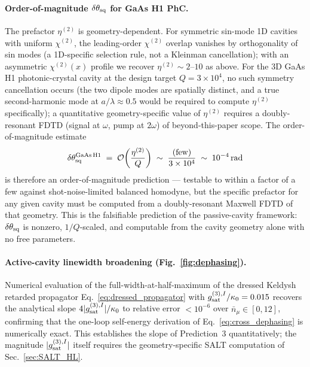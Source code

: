 \documentclass[12pt]{article}
\begin{document}
\paragraph{Order-of-magnitude $\delta\theta_{\rm sq}$ for GaAs H1 PhC.}
The prefactor $\eta^{(2)}$ is geometry-dependent.  For symmetric
sin-mode 1D cavities with uniform $\chi^{(2)}$, the leading-order
$\chi^{(2)}$ overlap vanishes by orthogonality of sin modes
(a 1D-specific selection rule, not a Kleinman cancellation); with an
asymmetric $\chi^{(2)}(x)$ profile we recover $\eta^{(2)}\sim 2$--$10$
as above.  For the 3D GaAs H1 photonic-crystal cavity at the design
target $Q=3\times 10^4$, no such symmetry cancellation occurs (the
two dipole modes are spatially distinct, and a true second-harmonic
mode at $a/\lambda\approx 0.5$ would be required to compute $\eta^{(2)}$
specifically); a quantitative geometry-specific value of $\eta^{(2)}$
requires a doubly-resonant FDTD (signal at $\omega$, pump at $2\omega$)
of beyond-this-paper scope.  The order-of-magnitude estimate
\begin{equation}
  \delta\theta_{\rm sq}^{\rm GaAs\,H1}
  \;=\; \mathcal{O}\!\left(\frac{\eta^{(2)}}{Q}\right)
  \;\sim\; \frac{\text{(few)}}{3\times 10^4}
  \;\sim\; 10^{-4}\,\mathrm{rad}
  \label{eq:delta_theta_sq_oom}
\end{equation}
is therefore an order-of-magnitude prediction --- testable to within a
factor of a few against shot-noise-limited balanced homodyne, but the
specific prefactor for any given cavity must be computed from a
doubly-resonant Maxwell FDTD of that geometry.  This is the falsifiable
prediction of the passive-cavity framework: $\delta\theta_{\rm sq}$
is nonzero, $1/Q$-scaled, and computable from the cavity geometry
alone with no free parameters.

\paragraph{Active-cavity linewidth broadening
(Fig.~\ref{fig:dephasing}).}
Numerical evaluation of the full-width-at-half-maximum of the
dressed Keldysh retarded propagator
Eq.~\eqref{eq:dressed_propagator} with $g^{(3),I}_{\rm sat}/\kappa_0=0.015$
recovers the analytical slope $4|g^{(3),I}_{\rm sat}|/\kappa_0$ to
relative error $<10^{-6}$ over $\bar{n}_\mu\in[0,12]$, confirming that
the one-loop self-energy derivation of Eq.~\eqref{eq:cross_dephasing}
is numerically exact.  This establishes the slope of
Prediction~3 quantitatively; the magnitude
$|g^{(3),I}_{\rm sat}|$ itself requires the geometry-specific SALT
computation of Sec.~\ref{sec:SALT_HL}.
\end{document}
